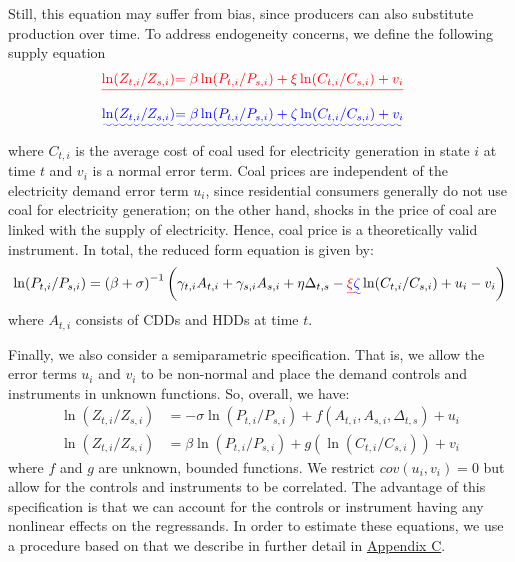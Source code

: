 \documentclass[11pt,a4paper,leqno]{extarticle}
\providecommand{\DIFadd}[1]{{\protect\color{blue}\uwave{#1}}} %
\providecommand{\DIFdel}[1]{{\protect\color{red}\sout{#1}}}                      %
\providecommand{\DIFaddbegin}{} %
\providecommand{\DIFaddend}{} %
\providecommand{\DIFdelbegin}{} %
\providecommand{\DIFdelend}{} %
\begin{document}
	Still, this equation may suffer from bias, since producers can also substitute production over time. To address endogeneity concerns, we define the following supply equation
	\DIFdelbegin \begin{eqnarray*}
		\DIFdel{\ln (Z_{ t, i} / Z_{ s, i}) }&\DIFdel{= \beta \ln (P_{t,i} / P_{s,i}) + \xi \ln (C_{t,i} / C_{s,i}) + v_{i}
	}\end{eqnarray*}%
	\DIFdelend \DIFaddbegin \begin{align}
	\DIFadd{\ln (Z_{ t, i} / Z_{ s, i}) }&\DIFadd{= \beta \ln (P_{t,i} / P_{s,i}) + \zeta \ln (C_{t,i} / C_{s,i}) + v_{i}
	}\end{align}\DIFaddend 
	where $C_{t,i}$ is the average cost of coal used for electricity generation in state $i$ at time $t$ and $v_i$ is a normal error term. Coal prices are independent of the electricity demand error term $u_i$, since residential consumers generally do not  use coal for electricity generation; on the other hand, shocks in the price of coal are linked with the supply of electricity. Hence, coal price is a theoretically valid instrument.  In total, the reduced form equation is given by:
	\begin{equation}
	\ln (P_{t,i} / P_{s,i}) = \left( \beta + \sigma \right)^{-1} \left( \gamma_{t,i} A_{t,i} + \gamma_{s,i} A_{s,i} + \eta \Delta_{t,s} - \DIFdelbegin \DIFdel{\xi }\DIFdelend \DIFaddbegin \DIFadd{\zeta }\DIFaddend \ln (C_{t,i} / C_{s,i}) + u_{i} - v_i \right)  
	\end{equation}
	where $A_{t,i}$ consists of CDDs and HDDs at time $t$. 
	
	Finally, we also consider a semiparametric specification. That is, we allow the error terms $u_i$ and $v_i$ to be non-normal and place the demand controls and instruments in unknown functions. So, overall, we have:
	\begin{align} \DIFaddbegin \label{eq:pariv1}
	\DIFaddend \ln (Z_{ t, i} / Z_{ s, i}) &= -\sigma \ln (P_{t,i} / P_{s,i}) +  f \left( A_{t,i}, A_{s,i}, \Delta_{t,s} \right) + u_i \\
	\ln (Z_{ t, i} / Z_{ s, i}) &= \beta \ln (P_{t,i} / P_{s,i}) + g \left( \ln (C_{t,i} / C_{s,i})  \right) + v_{i} \DIFaddbegin \label{eq:pariv2}
	\DIFaddend \end{align}
	where $f$ and $g$ are unknown, bounded functions. We restrict $cov(u_i, v_i) = 0$ but allow for the controls and instruments to be correlated. The advantage of this specification is that we can account for the controls or instrument having any nonlinear effects on the regressands. In order to estimate these equations, we use a procedure based on \citet{Newey} that we describe in further detail in \hyperref[sec:AppendixC]{Appendix C}.  \noindent
	
\end{document}
